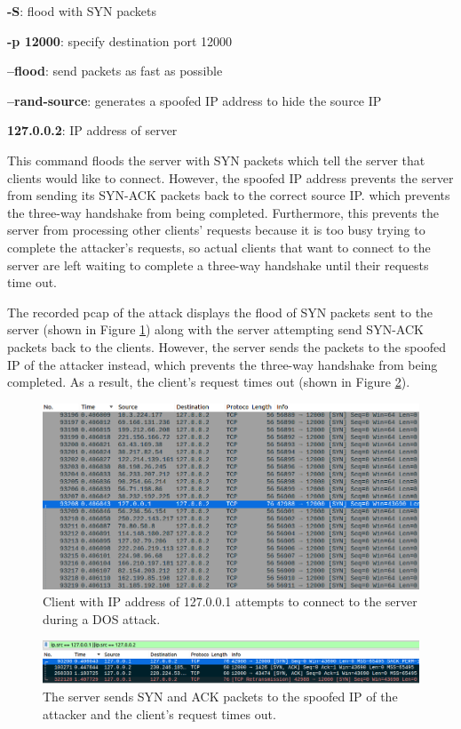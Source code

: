 \documentclass[11pt]{article}
\begin{document}
\textbf{-S}: flood with SYN packets

\textbf{-p 12000}: specify destination port 12000

\textbf{--flood}: send packets as fast as possible

\textbf{--rand-source}: generates a spoofed IP address to hide the source IP

\textbf{127.0.0.2}: IP address of server
\newline

This command floods the server with SYN packets which tell the server that clients would like to connect.
However, the spoofed IP address prevents the server from sending its SYN-ACK packets back to the correct source IP.
which prevents the three-way handshake from being completed.
Furthermore, this prevents the server from processing other clients' requests because it is too busy trying to complete the attacker's requests,
so actual clients that want to connect to the server are left waiting to complete a three-way handshake until their requests time out.
\newline

The recorded pcap of the attack displays the flood of SYN packets sent to the server (shown in Figure \ref{fig:client-attempt-flood})
along with the server attempting send SYN-ACK packets back to the clients.
However, the server sends the packets to the spoofed IP of the attacker instead,
which prevents the three-way handshake from being completed.
As a result, the client's request times out (shown in Figure \ref{fig:filtered-dos}).

\begin{figure}[h]
\centering
\includegraphics[width=.9\linewidth]{./client-attempt-flood.png}
\caption{\label{fig:client-attempt-flood}
Client with IP address of 127.0.0.1 attempts to connect to the server during a DOS attack.}
\end{figure}

\begin{figure}[h]
\centering
\includegraphics[width=.9\linewidth]{./filtered-dos.png}
\caption{\label{fig:filtered-dos}
The server sends SYN and ACK packets to the spoofed IP of the attacker and the client's request times out.}
\end{figure}
\end{document}
